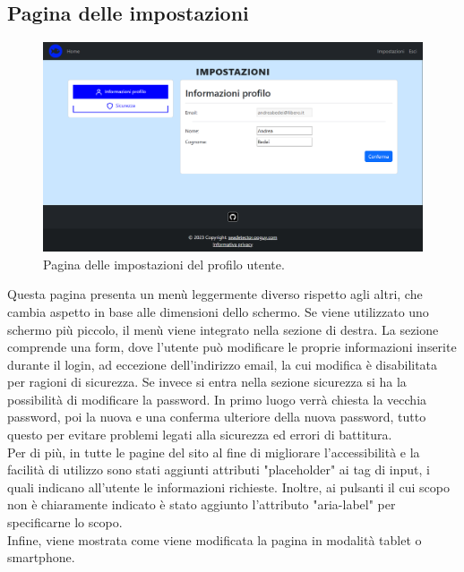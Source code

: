 \documentclass[a4paper,final,12pt]{report}
\begin{document}
\subsection{Pagina delle impostazioni}
\begin{figure}[hbtp]
\centering
\includegraphics[scale=0.36]{img_concettuale/impostazioniPG.png}
\caption{Pagina delle impostazioni del profilo utente.}
\end{figure}
Questa pagina presenta un menù leggermente diverso rispetto agli altri, che cambia aspetto in base alle dimensioni dello schermo. Se viene utilizzato uno schermo più piccolo, il menù viene integrato nella sezione di destra. La sezione comprende una form, dove l'utente può modificare le proprie informazioni inserite durante il login, ad eccezione dell'indirizzo email, la cui modifica è disabilitata per ragioni di sicurezza.
Se invece si entra nella sezione sicurezza si ha la possibilità di modificare la password. In primo luogo verrà chiesta la vecchia password, poi la nuova e una conferma ulteriore della nuova password, tutto questo per evitare problemi legati alla sicurezza ed errori di battitura.\\
Per di più, in tutte le pagine del sito al fine di migliorare l'accessibilità e la facilità di utilizzo sono stati aggiunti attributi "placeholder" ai tag di input, i quali indicano all'utente le informazioni richieste. Inoltre, ai pulsanti il cui scopo non è chiaramente indicato è stato aggiunto l'attributo "aria-label" per specificarne lo scopo.\\ Infine, viene mostrata come viene modificata la pagina in modalità tablet o smartphone.
\end{document}
